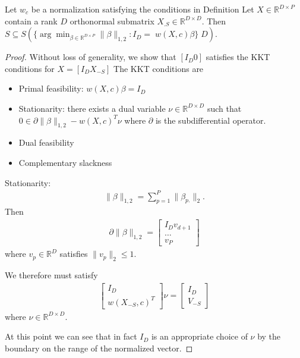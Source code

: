  \begin{proposition}
\label{prop:generalized_unitary_selection}
Let $w_c$ be a normalization satisfying the conditions in Definition %
Let $X \in \mathbb R^{D \times P}$ contain a rank $D$ orthonormal submatrix $X_{.S} \in \mathbb R^{D\times D}$.
Then $ S \subseteq S( \{\arg \min_{\beta \in \mathbb R^{D \times P}} \|\beta\|_{1,2} :  I_D = \; w(X,c) \beta\} \; D)$.
 \end{proposition}
 
 \begin{proof}
 
 Without loss of generality, we show that $[I_D 0]$ satisfies the KKT conditions for $X = [I_D X_{-S}]$
 The KKT conditions are 
 
\begin{itemize}
\item Primal feasibility: $w(X, c) \beta = I_D$
\item Stationarity: there exists a dual variable $\nu \in \mathbb{R}^{D \times D}$ such that $0 \in \partial \|\beta\|_{1,2} - w(X, c)^T \nu$  where $\partial$ is the subdifferential operator.
\item Dual feasibility
\item Complementary slackness
\end{itemize}

Stationarity: 
\begin{align}
\|\beta\|_{1,2} = \sum_{p = 1}^P \|\beta_{p.}\|_2.
\end{align}
Then
\begin{align}
\partial \|\beta\|_{1,2} = \begin{bmatrix}
I_D
v_{d+1} \\
\dotsc \\
v_P
\end{bmatrix}
\end{align}
where $v_p \in \mathbb R^{D}$ satisfies $\|v_p\|_2 \leq 1$.

We therefore must satisfy
\begin{align}
\begin{bmatrix}
I_D \\
w(X_{-S},c)^T
\end{bmatrix}\nu  = \begin{bmatrix}
I_D \\
V_{-S}
\end{bmatrix}
\end{align}
where $\nu \in \mathbb R^{D\times D}$.

At this point we can see that in fact $I_D$ is an appropriate choice of $\nu$ by the boundary on the range of the normalized vector.
 
\end{proof}

